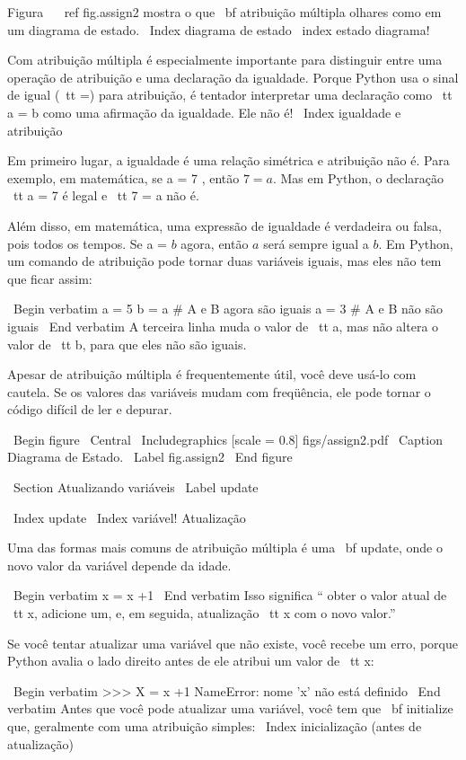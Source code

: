 \documentclass[10pt]{book}
\begin{document}
\begin {itemize}
{{{{Figura ~ \ ref {} fig.assign2 mostra o que {\ bf atribuição múltipla} olhares
como em um diagrama de estado. \ Index {diagrama de estado} \ index {estado diagrama!}

Com atribuição múltipla é especialmente importante para distinguir
entre uma operação de atribuição e uma declaração da igualdade. Porque
Python usa o sinal de igual ({\ tt =}) para atribuição, é tentador
interpretar uma declaração como {\ tt a = b} como uma afirmação da igualdade. Ele
não é!
\ Index {igualdade e atribuição}

Em primeiro lugar, a igualdade é uma relação simétrica e atribuição não é. Para
exemplo, em matemática, se a = 7 $ $, então $ 7 = a $. Mas em Python, o
declaração {\ tt a = 7} é legal e {\ tt 7 = a} não é.

Além disso, em matemática, uma expressão de igualdade é verdadeira ou
falsa, pois todos os tempos. Se a = $ b $ agora, então $ a $ será sempre igual a $ b $.
Em Python, um comando de atribuição pode tornar duas variáveis ​​iguais, mas
eles não tem que ficar assim:

\ Begin {verbatim}
a = 5
b = a # A e B agora são iguais
a = 3 # A e B não são iguais
\ End {verbatim}
%
A terceira linha muda o valor de {\ tt a}, mas não altera o
valor de {\ tt b}, para que eles não são iguais. 

Apesar de atribuição múltipla é frequentemente útil, você deve usá-lo
com cautela. Se os valores das variáveis ​​mudam com freqüência, ele pode
tornar o código difícil de ler e depurar.

\ Begin {figure}
\ Central
{\ Includegraphics [scale = 0.8] {figs/assign2.pdf}}
\ Caption {Diagrama de Estado.}
\ Label {} fig.assign2
\ End {figure}



\ Section {Atualizando variáveis}
\ Label {update}

\ Index {update}
\ Index {variável! Atualização}

Uma das formas mais comuns de atribuição múltipla é uma {\ bf update},
onde o novo valor da variável depende da idade.

\ Begin {verbatim}
x = x +1
\ End {verbatim}
%
Isso significa `` obter o valor atual de {\ tt x}, adicione um, e, em seguida,
atualização {\ tt x} com o novo valor.''

Se você tentar atualizar uma variável que não existe, você recebe um
erro, porque Python avalia o lado direito antes de ele atribui
um valor de {\ tt x}:

\ Begin {verbatim}
>>> X = x +1
NameError: nome 'x' não está definido
\ End {verbatim}
%
Antes que você pode atualizar uma variável, você tem que {\ bf initialize}
que, geralmente com uma atribuição simples:
\ Index {inicialização (antes de atualização)}

}}}}
\end{itemize}
\end{document}
